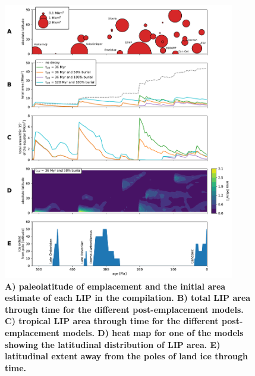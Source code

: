 \documentclass[11pt,letterpaper]{article}
\begin{document}
\begin{figure}[h!]
\begin{center}
	\includegraphics[width=0.9\textwidth]{Manuscript/Figures/LIP_Areas.pdf}
	\caption{\textbf{A) paleolatitude of emplacement and the initial area estimate of each LIP in the compilation.
    B) total LIP area through time for the different post-emplacement models.
    C) tropical LIP area through time for the different post-emplacement models.
    D) heat map for one of the models showing the latitudinal distribution of LIP area.
    E) latitudinal extent away from the poles of land ice through time.}}
	\label{fig:LIP_area}
\end{center}
\end{figure}
\end{document}
